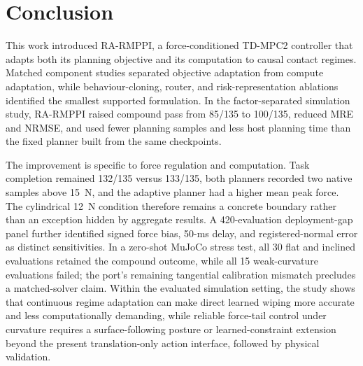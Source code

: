 \section{Conclusion}
\label{sec:conclusion}

This work introduced RA-RMPPI, a force-conditioned TD-MPC2 controller that
adapts both its planning objective and its computation to causal contact
regimes. Matched component studies separated objective adaptation from compute
adaptation, while behaviour-cloning, router, and risk-representation ablations
identified the smallest supported formulation. In the factor-separated
simulation study, RA-RMPPI raised compound pass from 85/135 to 100/135, reduced
MRE and NRMSE, and used fewer planning samples and less host planning time
than the fixed planner built from the same checkpoints.

The improvement is specific to force regulation and computation. Task
completion remained 132/135 versus 133/135, both planners recorded two native
samples above 15~N, and the adaptive planner had a higher mean peak force.
The cylindrical 12~N condition therefore remains a concrete boundary rather
than an exception hidden by aggregate results.  A 420-evaluation
deployment-gap panel further identified signed force bias, 50-ms delay, and
registered-normal error as distinct sensitivities. In a zero-shot MuJoCo
stress test, all 30 flat and inclined evaluations retained the compound
outcome, while all 15 weak-curvature evaluations failed; the port's remaining
tangential calibration mismatch precludes a matched-solver claim. Within the
evaluated simulation setting, the study shows that continuous regime adaptation can
make direct learned wiping more accurate and less computationally demanding,
while reliable force-tail control under curvature requires a surface-following
posture or learned-constraint extension beyond the present translation-only
action interface, followed by physical validation.
